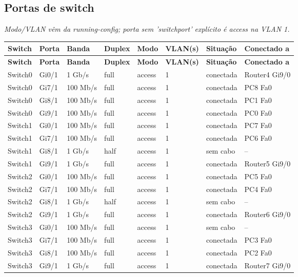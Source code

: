 \subsection{Portas de switch}
\noindent\textit{Modo/VLAN vêm da running-config; porta sem 'switchport' explícito é access na VLAN 1.}\par\smallskip
\begingroup\scriptsize\setlength{\tabcolsep}{3pt}
\begin{longtable}{@{}p{}p{}p{}p{}p{}p{}p{}p{}@{}}
\toprule \textbf{Switch} & \textbf{Porta} & \textbf{Banda} & \textbf{Duplex} & \textbf{Modo} & \textbf{VLAN(s)} & \textbf{Situação} & \textbf{Conectado a} \\\midrule\endfirsthead
\toprule \textbf{Switch} & \textbf{Porta} & \textbf{Banda} & \textbf{Duplex} & \textbf{Modo} & \textbf{VLAN(s)} & \textbf{Situação} & \textbf{Conectado a} \\\midrule\endhead
Switch0 & Gi0/1 & 1 Gb/s & full & access & 1 & conectada & Router4 Gi9/0 \\
Switch0 & Gi7/1 & 100 Mb/s & full & access & 1 & conectada & PC8 Fa0 \\
Switch0 & Gi8/1 & 100 Mb/s & full & access & 1 & conectada & PC1 Fa0 \\
Switch0 & Gi9/1 & 100 Mb/s & full & access & 1 & conectada & PC0 Fa0 \\
Switch1 & Gi0/1 & 100 Mb/s & full & access & 1 & conectada & PC7 Fa0 \\
Switch1 & Gi7/1 & 100 Mb/s & full & access & 1 & conectada & PC6 Fa0 \\
Switch1 & Gi8/1 & 1 Gb/s & half & access & 1 & sem cabo & -- \\
Switch1 & Gi9/1 & 1 Gb/s & full & access & 1 & conectada & Router5 Gi9/0 \\
Switch2 & Gi0/1 & 100 Mb/s & full & access & 1 & conectada & PC5 Fa0 \\
Switch2 & Gi7/1 & 100 Mb/s & full & access & 1 & conectada & PC4 Fa0 \\
Switch2 & Gi8/1 & 1 Gb/s & half & access & 1 & sem cabo & -- \\
Switch2 & Gi9/1 & 1 Gb/s & full & access & 1 & conectada & Router6 Gi9/0 \\
Switch3 & Gi0/1 & 100 Mb/s & full & access & 1 & sem cabo & -- \\
Switch3 & Gi7/1 & 100 Mb/s & full & access & 1 & conectada & PC3 Fa0 \\
Switch3 & Gi8/1 & 100 Mb/s & full & access & 1 & conectada & PC2 Fa0 \\
Switch3 & Gi9/1 & 1 Gb/s & full & access & 1 & conectada & Router7 Gi9/0 \\
\bottomrule
\end{longtable}\endgroup

